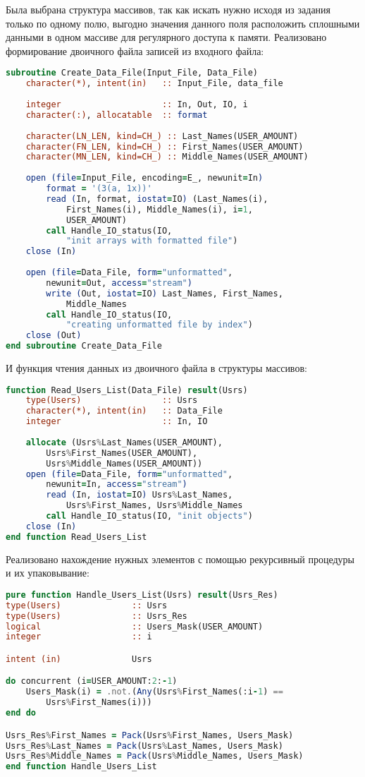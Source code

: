 \documentclass[a4paper,12pt]{article}
\begin{document}
Была выбрана структура массивов, так как искать нужно исходя из задания только по одному полю, выгодно значения данного поля расположить сплошными данными в одном массиве для регулярного доступа к памяти. Реализовано формирование двоичного файла записей из входного файла:
\begin{lstlisting}[language=Fortran]
subroutine Create_Data_File(Input_File, Data_File)
	character(*), intent(in)   :: Input_File, data_file
	
	integer                    :: In, Out, IO, i
	character(:), allocatable  :: format
	
	character(LN_LEN, kind=CH_) :: Last_Names(USER_AMOUNT)
	character(FN_LEN, kind=CH_) :: First_Names(USER_AMOUNT)
	character(MN_LEN, kind=CH_) :: Middle_Names(USER_AMOUNT)
	
	open (file=Input_File, encoding=E_, newunit=In)
		format = '(3(a, 1x))'
		read (In, format, iostat=IO) (Last_Names(i), 
			First_Names(i), Middle_Names(i), i=1, 
			USER_AMOUNT)
		call Handle_IO_status(IO, 
			"init arrays with formatted file")
	close (In)
	
	open (file=Data_File, form="unformatted", 
		newunit=Out, access="stream")
		write (Out, iostat=IO) Last_Names, First_Names, 
			Middle_Names
		call Handle_IO_status(IO, 
			"creating unformatted file by index")
	close (Out)
end subroutine Create_Data_File
\end{lstlisting}

И функция чтения данных из двоичного файла в структуры массивов:
\begin{lstlisting}[language=Fortran]
function Read_Users_List(Data_File) result(Usrs)
	type(Users)                :: Usrs
	character(*), intent(in)   :: Data_File
	integer                    :: In, IO
	
	allocate (Usrs%Last_Names(USER_AMOUNT), 
		Usrs%First_Names(USER_AMOUNT), 
		Usrs%Middle_Names(USER_AMOUNT))
	open (file=Data_File, form="unformatted", 
		newunit=In, access="stream")
		read (In, iostat=IO) Usrs%Last_Names, 
			Usrs%First_Names, Usrs%Middle_Names
		call Handle_IO_status(IO, "init objects")
	close (In)
end function Read_Users_List
\end{lstlisting}

Реализовано нахождение нужных элементов с помощью рекурсивный процедуры и их упаковывание:
\begin{lstlisting}[language=Fortran]
pure function Handle_Users_List(Usrs) result(Usrs_Res)
type(Users)              :: Usrs
type(Users)              :: Usrs_Res
logical                  :: Users_Mask(USER_AMOUNT)
integer                  :: i

intent (in)              Usrs

do concurrent (i=USER_AMOUNT:2:-1)
	Users_Mask(i) = .not.(Any(Usrs%First_Names(:i-1) == 
		Usrs%First_Names(i)))
end do

Usrs_Res%First_Names = Pack(Usrs%First_Names, Users_Mask)
Usrs_Res%Last_Names = Pack(Usrs%Last_Names, Users_Mask)
Usrs_Res%Middle_Names = Pack(Usrs%Middle_Names, Users_Mask)
end function Handle_Users_List
\end{lstlisting}
\end{document}
